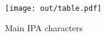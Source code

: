 \documentclass[tikz]{article}
\begin{document}
\begin{figure}
\centerline{
    \texttt{[image: out/table.pdf]}
}
\caption{Main IPA characters}
\end{figure}
\end{document}
